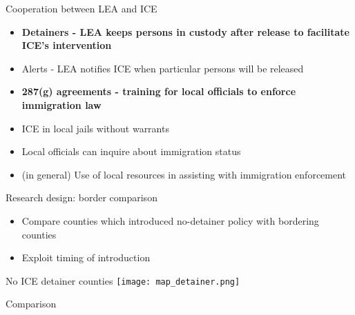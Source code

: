 \documentclass[xcolor=pdftex,dvipsnames,table]{beamer}
\newcommand{\tablesfolder}{/Users/bbiasi/Dropbox/Research/sanctuaries/out}
\begin{document}
\begin{frame}{Cooperation between LEA and ICE}
\begin{itemize}
\item \textbf{Detainers - LEA keeps persons in custody after release to facilitate ICE's intervention}
\item Alerts - LEA notifies ICE when particular persons will be released
\item \textbf{287(g) agreements - training for local officials to enforce immigration law}
\item ICE in local jails without warrants
\item Local officials can inquire about immigration status
\item (in general)  Use of local resources in assisting with immigration enforcement
\end{itemize}
\end{frame}


\begin{frame}{Research design: border comparison}
\begin{itemize}
\item Compare counties which introduced no-detainer policy with bordering counties
\item Exploit timing of introduction
\end{itemize}
\end{frame}

\begin{frame}{No ICE detainer counties}
\texttt{[image: map\_detainer.png]}
\end{frame}

\begin{frame}{Comparison}
\tiny

\end{frame}
\end{document}
